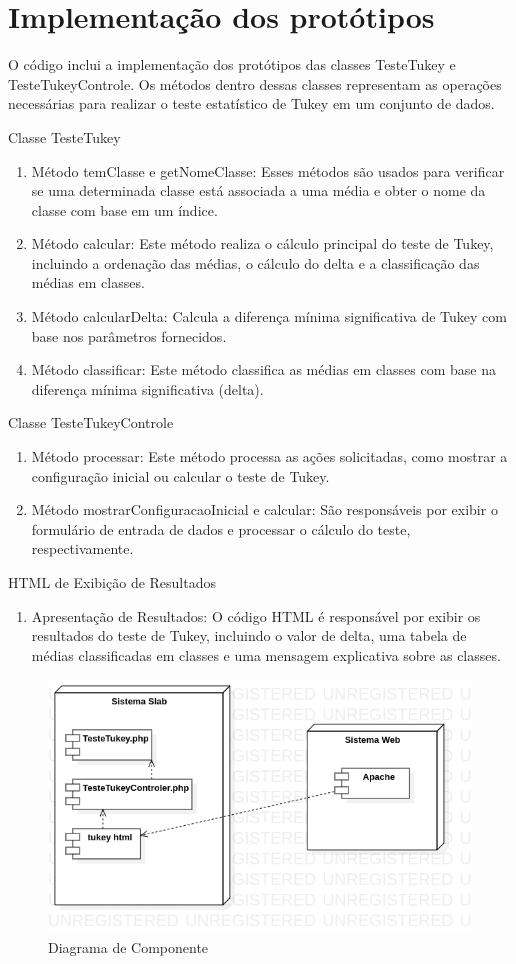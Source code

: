\chapter{Implementação dos protótipos}
O código inclui a implementação dos protótipos das classes TesteTukey e TesteTukeyControle. Os métodos dentro dessas classes representam as operações necessárias para realizar o teste estatístico de Tukey em um conjunto de dados.


Classe TesteTukey
\begin{enumerate}
  \item Método temClasse e getNomeClasse: Esses métodos são usados para verificar se uma determinada classe está associada a uma média e obter o nome da classe com base em um índice.
  \item Método calcular: Este método realiza o cálculo principal do teste de Tukey, incluindo a ordenação das médias, o cálculo do delta e a classificação das médias em classes.
  \item Método calcularDelta: Calcula a diferença mínima significativa de Tukey com base nos parâmetros fornecidos.
  \item Método classificar: Este método classifica as médias em classes com base na diferença mínima significativa (delta).
\end{enumerate}


Classe TesteTukeyControle
\begin{enumerate}
  \item Método processar: Este método processa as ações solicitadas, como mostrar a configuração inicial ou calcular o teste de Tukey.
  \item Método mostrarConfiguracaoInicial e calcular: São responsáveis por exibir o formulário de entrada de dados e processar o cálculo do teste, respectivamente.
\end{enumerate}


HTML de Exibição de Resultados
\begin{enumerate}
  \item  Apresentação de Resultados: O código HTML é responsável por exibir os resultados do teste de Tukey, incluindo o valor de delta, uma tabela de médias classificadas em classes e uma mensagem explicativa sobre as classes.
\end{enumerate}

\begin{figure}[H]
  \centering
  \includegraphics[width=0.8\linewidth]{imagens/componente.png} 
  \caption{Diagrama de Componente}
  \label{fig:exemplo}
\end{figure}


